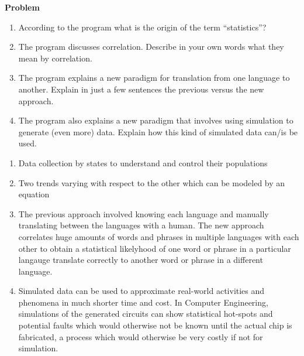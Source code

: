 \documentclass[12pt]{article}
\newenvironment{Ex}{\textbf{Problem}\vspace{.75em}\\}{}
\begin{document}
\begin{enumerate}
\begin{Ex}
\begin{enumerate}
    \item According to the program what is the origin of the term
      ``statistics''?
    \item The program discusses correlation. Describe in your own
      words what they mean by correlation.
    \item The program explains a new paradigm for translation from one
      language to another. Explain in just a few sentences the
      previous versus the new approach.
    \item The program also explains a new paradigm that involves using
      simulation to generate (even more) data. Explain how this kind
      of simulated data can/is be used.
    \end{enumerate}
    \begin{solution} \hfill
      \begin{enumerate}
      \item Data collection by states to understand and control their
        populations
      \item Two trends varying with respect to the other which can be
        modeled by an equation
      \item The previous approach involved knowing each language and
        manually translating between the languages with a human. The
        new approach correlates huge amounts of words and phrases in
        multiple languages with each other to obtain a statistical
        likelyhood of one word or phrase in a particular langauge
        translate correctly to another word or phrase in a different
        language.
      \item Simulated data can be used to approximate real-world
        activities and phenomena in much shorter time and cost. In
        Computer Engineering, simulations of the generated circuits
        can show statistical hot-spots and potential faults which
        would otherwise not be known until the actual chip is
        fabricated, a process which would otherwise be very costly if
        not for simulation.
      \end{enumerate}
    \end{solution}
  \end{Ex}
\end{enumerate}
\end{document}
